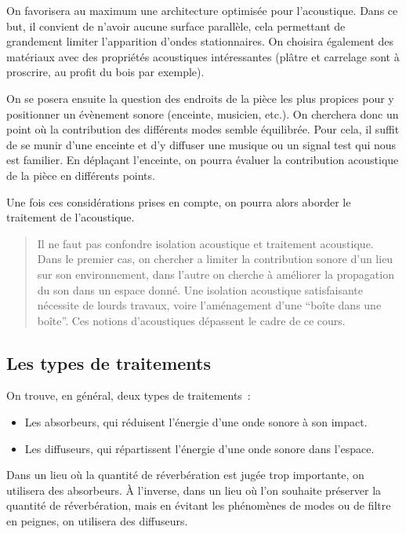 \documentclass[
]{book}
\providecommand{\tightlist}{%
  \setlength{\itemsep}{0pt}\setlength{\parskip}{0pt}}
\begin{document}
On favorisera au maximum une architecture optimisée pour l'acoustique. Dans ce but, il convient de n'avoir aucune surface parallèle, cela permettant de grandement limiter l'apparition d'ondes stationnaires. On choisira également des matériaux avec des propriétés acoustiques intéressantes (plâtre et carrelage sont à proscrire, au profit du bois par exemple).

On se posera ensuite la question des endroits de la pièce les plus propices pour y positionner un évènement sonore (enceinte, musicien, etc.). On cherchera donc un point où la contribution des différents modes semble équilibrée. Pour cela, il suffit de se munir d'une enceinte et d'y diffuser une musique ou un signal test qui nous est familier. En déplaçant l'enceinte, on pourra évaluer la contribution acoustique de la pièce en différents points.

Une fois ces considérations prises en compte, on pourra alors aborder le traitement de l'acoustique.

\begin{quote}
Il ne faut pas confondre isolation acoustique et traitement acoustique. Dans le premier cas, on chercher a limiter la contribution sonore d'un lieu sur son environnement, dans l'autre on cherche à améliorer la propagation du son dans un espace donné. Une isolation acoustique satisfaisante nécessite de lourds travaux, voire l'aménagement d'une ``boîte dans une boîte''. Ces notions d'acoustiques dépassent le cadre de ce cours.
\end{quote}

\hypertarget{les-types-de-traitements}{%
\subsection{Les types de traitements}\label{les-types-de-traitements}}

On trouve, en général, deux types de traitements~:

\begin{itemize}
\tightlist
\item
  Les absorbeurs, qui réduisent l'énergie d'une onde sonore à son impact.
\item
  Les diffuseurs, qui répartissent l'énergie d'une onde sonore dans l'espace.
\end{itemize}

Dans un lieu où la quantité de réverbération est jugée trop importante, on utilisera des absorbeurs. À l'inverse, dans un lieu où l'on souhaite préserver la quantité de réverbération, mais en évitant les phénomènes de modes ou de filtre en peignes, on utilisera des diffuseurs.
\end{document}
